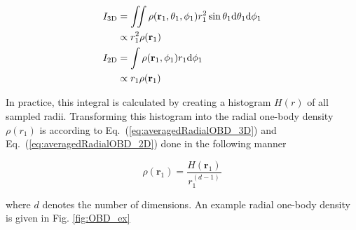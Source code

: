\begin{align}
 I_\mathrm{3D} &= \iint \rho (\mathbf{r}_1, \theta_1, \phi_1)r_1^2\sin\theta_1\mathrm{d}\theta_1\mathrm{d}\phi_1 \notag\\
   &\propto r_1^2\rho(\mathbf{r}_1) \label{eq:averagedRadialOBD_3D} \\
 I_\mathrm{2D} &= \int \rho (\mathbf{r}_1, \phi_1)r_1\mathrm{d}\phi_1 \notag\\
   &\propto r_1\rho(\mathbf{r}_1) \label{eq:averagedRadialOBD_2D}
\end{align}

In practice, this integral is calculated by creating a histogram $H(r)$ of all sampled radii. Transforming this histogram into the radial one-body density $\rho(r_1)$ is according to Eq.~(\ref{eq:averagedRadialOBD_3D}) and Eq.~(\ref{eq:averagedRadialOBD_2D}) done in the following manner

\begin{equation}
 \rho(\mathbf{r}_1) = \frac{H(\mathbf{r}_1)}{r_1^{(d-1)}}\label{eq:radial_OBD}
\end{equation}

where $d$ denotes the number of dimensions. An example radial one-body density is given in Fig. \ref{fig:OBD_ex}

